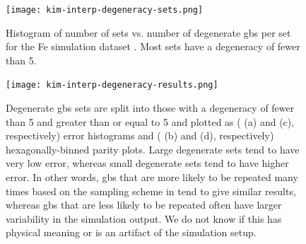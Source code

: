\documentclass[preprint,12pt]{elsarticle}
\begin{document}
	\begin{figure}
		\centering
		\texttt{[image: kim-interp-degeneracy-sets.png]}
		\caption{Histogram of number of sets vs. number of degenerate \glspl{gb} per set for the Fe simulation dataset \cite{kimPhasefieldModeling3D2014}. Most sets have a degeneracy of fewer than 5.}
		\label{fig:kim-interp-degeneracy-sets}
	\end{figure}
	
	\begin{figure}
		\centering
		\texttt{[image: kim-interp-degeneracy-results.png]}
		\caption{Degenerate \glspl{gb} sets are split into those with a degeneracy of fewer than 5 and greater than or equal to 5 and plotted as ( (a) and (c), respectively) error histograms and ( (b) and (d), respectively) hexagonally-binned parity plots. Large degenerate sets tend to have very low error, whereas small degenerate sets tend to have higher error. In other words, \glspl{gb} that are more likely to be repeated many times based on the sampling scheme in \cite{kimPhasefieldModeling3D2014} tend to give similar results, whereas \glspl{gb} that are less likely to be repeated often have larger variability in the simulation output. We do not know if this has physical meaning or is an artifact of the simulation setup.}
		\label{fig:kim-interp-degeneracy-results}
	\end{figure}
	
	
	
\end{document}
